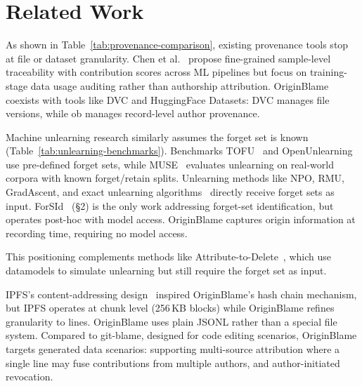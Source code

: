 \section{Related Work}

As shown in Table~\ref{tab:provenance-comparison}, existing provenance tools stop at file or dataset granularity. Chen et al.~\cite{chen2026finegrained} propose fine-grained sample-level traceability with contribution scores across ML pipelines but focus on training-stage data usage auditing rather than authorship attribution. OriginBlame coexists with tools like DVC and HuggingFace Datasets: DVC manages file versions, while ob manages record-level author provenance.

Machine unlearning research similarly assumes the forget set is known (Table~\ref{tab:unlearning-benchmarks}). Benchmarks TOFU~\cite{maini2024tofu} and OpenUnlearning use pre-defined forget sets, while MUSE~\cite{shi2025muse} evaluates unlearning on real-world corpora with known forget/retain splits. Unlearning methods like NPO, RMU, GradAscent, and exact unlearning algorithms~\cite{muresanu2025exact} directly receive forget sets as input. ForSId~\cite{dangelo2025forsid} (\S2) is the only work addressing forget-set identification, but operates post-hoc with model access. OriginBlame captures origin information at recording time, requiring no model access. 

This positioning complements methods like Attribute-to-Delete~\cite{georgiev2024attribute}, which use datamodels to simulate unlearning but still require the forget set as input.

IPFS's content-addressing design~\cite{trautwein2022ipfs} inspired OriginBlame's hash chain mechanism, but IPFS operates at chunk level (256\,KB blocks) while OriginBlame refines granularity to lines. OriginBlame uses plain JSONL rather than a special file system. Compared to git-blame, designed for code editing scenarios, OriginBlame targets generated data scenarios: supporting multi-source attribution where a single line may fuse contributions from multiple authors, and author-initiated revocation.
